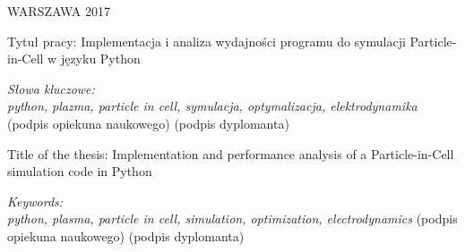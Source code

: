 \vspace{15mm}

WARSZAWA 2017 %

\newpage
\thispagestyle{empty}
\phantom{Nothing here}
\newpage
\clearpage
\phantom{Here neither}

\setcounter{page}{3}
\vspace{-1.5cm}
\begin{flushleft}
	Tytuł pracy: Implementacja i analiza wydajności programu do symulacji Particle-in-Cell w języku Python%
\end{flushleft}
\vspace{0.5cm}

\vspace{0.5cm}
\noindent \textit{Słowa kluczowe: \\ python, plazma, particle in cell, symulacja, optymalizacja, elektrodynamika} %
\vfill
(podpis opiekuna naukowego) \hfill (podpis dyplomanta)

\newpage
\thispagestyle{empty}
\phantom{Nothing here}
\newpage
\clearpage
\phantom{Here neither}

\setcounter{page}{5}
\vspace{-1.5cm}
\begin{flushleft}
	Title of the thesis: Implementation and performance analysis of a Particle-in-Cell simulation code in Python%
\end{flushleft}
\vspace{0.5cm}
\vspace{0.5cm}
\noindent \textit{Keywords: \\ python, plasma, particle in cell, simulation, optimization, electrodynamics} %
\vfill
(podpis opiekuna naukowego) \hfill (podpis dyplomanta)

\newpage
\thispagestyle{empty}
\phantom{Nothing here}
\newpage
\clearpage
\phantom{Here neither}

